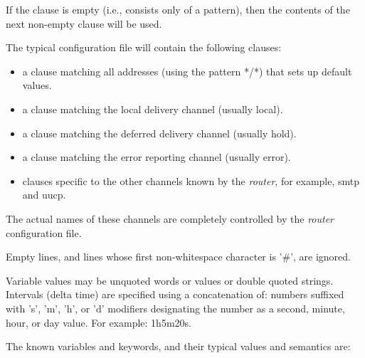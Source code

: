If the clause is empty (i.e., consists only of a pattern),
then the contents of the next non-empty clause will be used.

The typical configuration file will contain the following clauses:
\begin{itemize}
\item a clause matching all addresses (using the pattern */*) that sets 
up default values.
\item a  clause  matching  the  local delivery channel
(usually local).
\item a clause matching the deferred    delivery  channel
(usually hold).
\item a  clause  matching  the error reporting channel
(usually error).
\item clauses specific to the other channels    known  by
the {\em router}, for example, smtp and uucp.
\end{itemize}


The  actual  names  of  these channels are completely 
controlled by the {\em router} configuration file.

Empty  lines,  and  lines   whose   first   non-whitespace
character is '\#', are ignored.

Variable values may be unquoted words or values or double 
quoted strings.  Intervals  (delta  time)  are  specified
using  a concatenation of: numbers suffixed with 's', 'm',
'h', or 'd' modifiers designating the number as a  second,
minute, hour, or day value.  For example: 1h5m20s.

The known variables and keywords, and their typical values
and semantics are:

